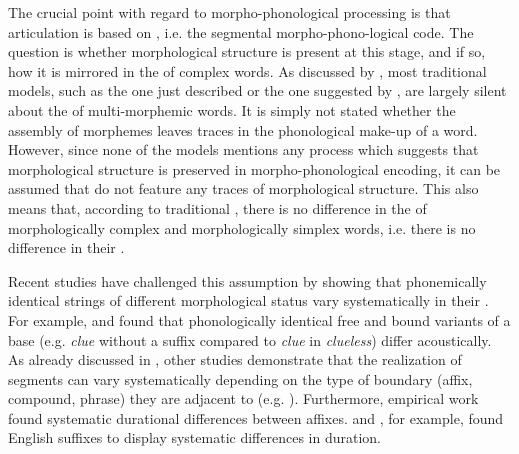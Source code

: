 The crucial point with regard to morpho-phonological processing is that articulation is based on , i.e. the segmental morpho-phono-logical code. The question is whether morphological structure is present at this stage, and if so, how it is mirrored in the  of complex words.
 As discussed by \citet[1037]{CohenGoldberg.2013}, most traditional models, such as the one just described or the one suggested by \cite{Dell.1986}, are largely silent about the  of multi-morphemic words. It is simply not stated whether the assembly of morphemes leaves traces in the phonological make-up of a word. However, since none of the models mentions any process which suggests that morphological structure is preserved in morpho-phonological encoding, it can be assumed that  do not feature any traces of morphological structure. This also means that, according to traditional , there is no difference in the  of morphologically complex and morphologically simplex words, i.e. there is no difference in their .

Recent studies have challenged this assumption by showing that phonemically identical strings of different morphological status vary systematically in their . For example, \cite{Kemps.2005} and \citet{Blazej.2015} found that phonologically identical free and bound variants of a base (e.g. \textit{clue} without a suffix compared to \textit{clue} in \textit{clueless}) differ acoustically.
As already discussed in , other studies demonstrate that the realization of segments can vary systematically depending on the type of boundary (affix, compound, phrase) they are adjacent to  (e.g. \citealt{Sproat.1993b, Smith.2012,LeeKim.2013}). Furthermore, empirical work found systematic durational differences between  affixes. \cite{Plag.2017} and \cite{Godfrey.2016}, for example, found  English suffixes to display systematic differences in duration.
 
